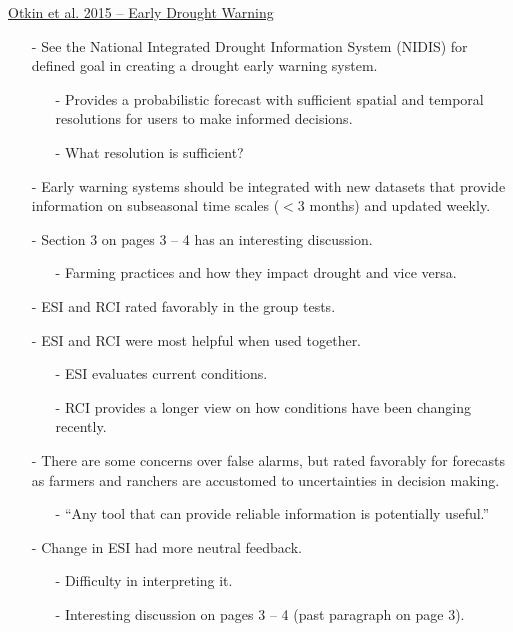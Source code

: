 \documentclass[12pt, letterpaper]{article}
\begin{document}
    \underline{Otkin et al. 2015 -- Early Drought Warning}
    \begin{itemize}
    	\item[-] See the National Integrated Drought Information System (NIDIS) for defined goal in 
    	         creating a drought early warning system.
    	\begin{itemize}
    		\item[-] Provides a probabilistic forecast with sufficient spatial and temporal resolutions
    		         for users to make informed decisions.
    		\item[-] What resolution is sufficient?
    	\end{itemize}
        \item[-] Early warning systems should be integrated with new datasets that provide information on
                 subseasonal time scales ($< 3$ months) and updated weekly.
        \item[-] Section 3 on pages 3 -- 4 has an interesting discussion.
        \begin{itemize}
        	\item[-] Farming practices and how they impact drought and vice versa.
        \end{itemize}
        \item[-] ESI and RCI rated favorably in the group tests.
        \item[-] ESI and RCI were most helpful when used together.
        \begin{itemize}
        	\item[-] ESI evaluates current conditions.
        	\item[-] RCI provides a longer view on how conditions have been changing recently.
        \end{itemize}
        \item[-] There are some concerns over false alarms, but rated favorably for forecasts as
                 farmers and ranchers are accustomed to uncertainties in decision making.
        \begin{itemize}
        	\item[-] ``Any tool that can provide reliable information is potentially useful.''
        \end{itemize}
        \item[-] Change in ESI had more neutral feedback.
        \begin{itemize}
        	\item[-] Difficulty in interpreting it.
        	\item[-] Interesting discussion on pages 3 -- 4 (past paragraph on page 3).

\end{itemize}
\end{itemize}
\end{document}
